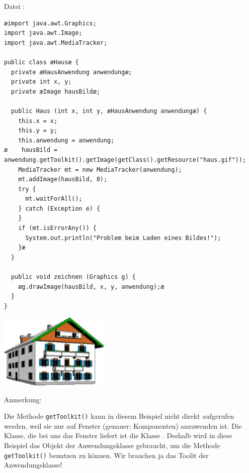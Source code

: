 \vspace{5mm}

Datei :

\begin{lstlisting}
æimport java.awt.Graphics;
import java.awt.Image;
import java.awt.MediaTracker;

public class æHausæ {
  private æHausAnwendung anwendungæ;
  private int x, y;
  private æImage hausBildæ;

  public Haus (int x, int y, æHausAnwendung anwendungæ) {
    this.x = x;
    this.y = y;
    this.anwendung = anwendung;
æ    hausBild = anwendung.getToolkit().getImage(getClass().getResource("haus.gif"));
    MediaTracker mt = new MediaTracker(anwendung);
    mt.addImage(hausBild, 0);
    try {
      mt.waitForAll();
    } catch (Exception e) {
    }
    if (mt.isErrorAny()) {
      System.out.println("Problem beim Laden eines Bildes!");
    }æ
  }

  public void zeichnen (Graphics g) {
    æg.drawImage(hausBild, x, y, anwendung);æ
  }
}
\end{lstlisting}

\vspace{12mm}

\begin{center}
\includegraphics[width=0.4\textwidth]{./inf/SEKII/13_Java_Bilder/haus.png}
\end{center}

Anmerkung:

Die Methode \lstinline|getToolkit()| kann in diesem Beispiel nicht direkt
aufgerufen werden, weil sie nur auf Fenster (genauer: Komponenten) anzuwenden
ist. Die Klasse, die bei uns das Fenster liefert ist die Klasse
. Deshalb wird in diese Beispiel das Objekt der
Anwendungsklasse gebraucht, um die Methode \lstinline|getToolkit()| benutzen zu
können. Wir brauchen ja das Toolit der Anwendungsklasse!
